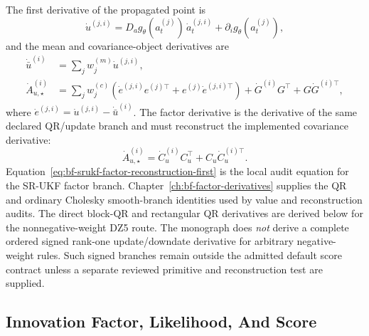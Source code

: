 The first derivative of the propagated point is
\begin{equation}
\label{eq:bf-srukf-propagated-point-first}
  \dot u^{(j,i)}
  =
  D_a g_\theta(a_t^{(j)})\,\dot a_t^{(j,i)}
  +\partial_i g_\theta(a_t^{(j)}),
\end{equation}
and the mean and covariance-object derivatives are
\begin{align}
\label{eq:bf-srukf-moment-mean-first}
  \dot{\bar u}^{(i)}
  &=
  \sum_j w_j^{(m)}\dot u^{(j,i)},\\
\label{eq:bf-srukf-moment-covariance-first}
  \dot A_{u,\star}^{(i)}
  &=
  \sum_j w_j^{(c)}
  \left(
    \dot e^{(j,i)}e^{(j)\top}
    +e^{(j)}\dot e^{(j,i)\top}
  \right)
  +\dot G^{(i)}G^\top+G\dot G^{(i)\top},
\end{align}
where \(\dot e^{(j,i)}=\dot u^{(j,i)}-\dot{\bar u}^{(i)}\).  The factor
derivative is the derivative of the same declared QR/update branch and must
reconstruct the implemented covariance derivative:
\begin{equation}
\label{eq:bf-srukf-factor-reconstruction-first}
  \dot A_{u,\star}^{(i)}
  =
  \dot C_u^{(i)}C_u^\top+C_u\dot C_u^{(i)\top}.
\end{equation}
Equation~\eqref{eq:bf-srukf-factor-reconstruction-first} is the local audit
equation for the SR-UKF factor branch.  Chapter~\ref{ch:bf-factor-derivatives}
supplies the QR and ordinary Cholesky smooth-branch identities used by value and
reconstruction audits.  The direct block-QR and rectangular QR derivatives are
derived below for the nonnegative-weight DZ5 route.  The monograph does
\emph{not} derive a complete ordered signed rank-one update/downdate derivative
for arbitrary negative-weight rules.  Such signed branches remain outside the
admitted default score contract unless a separate reviewed primitive and
reconstruction test are supplied.

\subsection{Innovation Factor, Likelihood, And Score}
\label{sec:bf-srukf-innovation-score}

